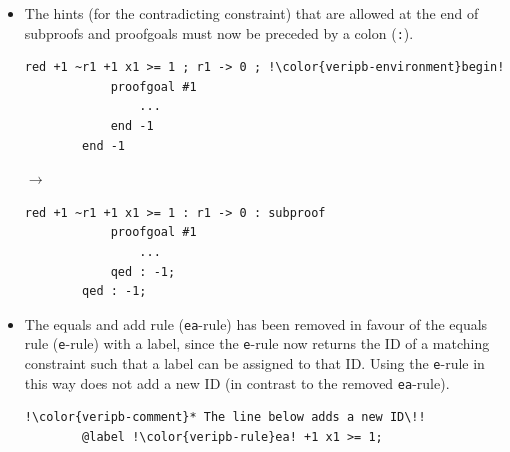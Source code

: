 \documentclass[a4paper]{article}
\newcommand{\veriPB}[0]{\textsc{VeriPB}}
\begin{document}
\begin{itemize}
\begin{minipage}{.47\linewidth}
\begin{lstlisting}[language=veripb, gobble=8, rulecolor=\color{veripb-valid-text}, caption={\veriPB{} 3.0 syntax.}]
			...

		qed;
		\end{lstlisting}
	      \end{minipage}
	\item The hints (for the contradicting constraint) that are allowed at the end of subproofs and proofgoals must now be preceded by a colon (\verb!:!).
	      \\[1mm]
	      \begin{minipage}{.47\linewidth}
		      \begin{lstlisting}[language=veripb, gobble=8, rulecolor=\color{veripb-invalid-text}, caption={\veriPB{} 2.0 syntax.}]
		red +1 ~r1 +1 x1 >= 1 ; r1 -> 0 ; !\color{veripb-environment}begin!
			proofgoal #1
				...
			end -1
		end -1
		\end{lstlisting}
	      \end{minipage}\hfill%
	      \begin{minipage}[t]{.05\linewidth}
		      \centering \vspace*{-5mm}$\to$
	      \end{minipage}\hfill%
	      \hfill%
	      \begin{minipage}{.47\linewidth}
		      \begin{lstlisting}[language=veripb, gobble=8, rulecolor=\color{veripb-valid-text}, caption={\veriPB{} 3.0 syntax.}]
		red +1 ~r1 +1 x1 >= 1 : r1 -> 0 : subproof
			proofgoal #1
				...
			qed : -1;
		qed : -1;
		\end{lstlisting}
	      \end{minipage}
	\item The equals and add rule (\verb!ea!-rule) has been removed in favour of the equals rule (\lstinline[language=veripb]!e!-rule) with a label, since the \lstinline[language=veripb]!e!-rule now returns the ID of a matching constraint such that a label can be assigned to that ID. Using the \lstinline[language=veripb]!e!-rule in this way does not add a new ID (in contrast to the removed \verb!ea!-rule).
	      \\[1mm]
	      \begin{minipage}{.47\linewidth}
		      \begin{lstlisting}[language=veripb, gobble=8, rulecolor=\color{veripb-invalid-text}, caption={\veriPB{} 2.0 syntax.}]
		!\color{veripb-comment}* The line below adds a new ID\!!
		@label !\color{veripb-rule}ea! +1 x1 >= 1;
		\end{lstlisting}
	      \end{minipage}\hfill%
	      \begin{minipage}[t]{.05\linewidth}

\end{minipage}
\end{itemize}
\end{document}
